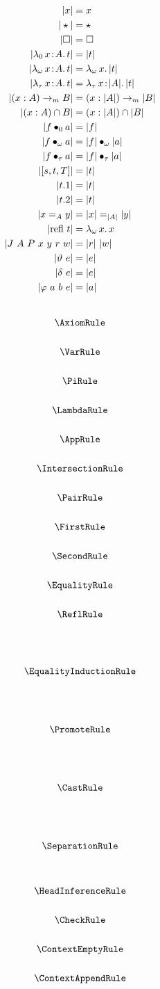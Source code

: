 \begin{align*}
    |x| &= x \\
    |\star| &= \star \\
    |\square| &= \square \\
    |\abs{\lambda_0}{x}{A}{t}| &= |t| \\
    |\abs{\lambda_\omega}{x}{A}{t}| &= \absu{\lambda_\omega}{x}{|t|} \\
    |\abs{\lambda_\tau}{x}{A}{t}| &= \abs{\lambda_\tau}{x}{|A|}{|t|} \\
    |(x:A) \to_m B| &= (x:|A|) \to_m |B| \\
    |(x:A) \cap B| &= (x:|A|) \cap |B| \\
    |\app{f}{0}{a}| &= |f| \\
    |\app{f}{\omega}{a}| &= \app{|f|}{\omega}{|a|} \\
    |\app{f}{\tau}{a}| &= \app{|f|}{\tau}{|a|} \\
    |[s, t, T]| &= |t| \\
    |t.1| &= |t| \\
    |t.2| &= |t| \\
    |x =_A y| &= |x| =_{|A|} |y| \\
    |\text{refl}\ t| &= \absu{\lambda_\omega}{x}{x} \\
    |J\ A\ P\ x\ y\ r\ w| &= |r|\ |w| \\
    |\vartheta\ e| &= |e| \\
    |\delta\ e| &= |e| \\
    |\varphi\ a\ b\ e| &= |a|
\end{align*}

\[\arraycolsep=2pt\def\arraystretch{2.5}
    \begin{array}{c}
        \AxiomRule \\
        \VarRule \\
        \PiRule \\
        \LambdaRule \\
        \AppRule \\
        \IntersectionRule \\
        \PairRule \\
        \FirstRule \\
        \SecondRule \\
        \EqualityRule \\
        \ReflRule
    \end{array}
\]
\[\arraycolsep=6pt\def\arraystretch{5}
    \begin{array}{c}
        \EqualityInductionRule \\
        \PromoteRule \\
        \CastRule \\
        \SeparationRule
    \end{array}
\]
\[\arraycolsep=2pt\def\arraystretch{2.5}
    \begin{array}{c}
        \HeadInferenceRule \\
        \CheckRule \\
        \ContextEmptyRule \\
        \ContextAppendRule
    \end{array}
\]





